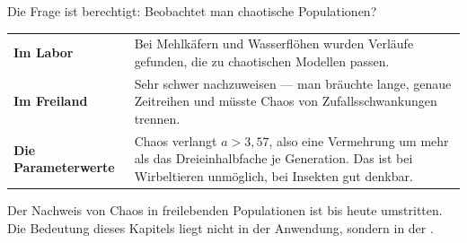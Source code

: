 \begin{warnung}
Die Frage ist berechtigt: Beobachtet man chaotische Populationen?

\begin{center}
{\small
\renewcommand{\arraystretch}{1.5}
\begin{tabular}{@{}P{2.6cm}P{6.0cm}@{}}
\toprule
\textbf{Im Labor} & Bei Mehlkäfern und Wasserflöhen wurden Verläufe gefunden, die zu chaotischen Modellen passen.\\
\textbf{Im Freiland} & Sehr schwer nachzuweisen --- man bräuchte lange, genaue Zeitreihen und müsste Chaos von Zufallsschwankungen trennen.\\
\textbf{Die Parameterwerte} & Chaos verlangt $a > 3{,}57$, also eine Vermehrung um mehr als das Dreieinhalbfache je Generation. Das ist bei Wirbeltieren unmöglich, bei Insekten gut denkbar.\\
\bottomrule
\end{tabular}}
\end{center}

\begin{center}
\begin{minipage}{0.9\textwidth}
Der Nachweis von Chaos in freilebenden Populationen ist bis heute umstritten. Die Bedeutung dieses Kapitels liegt nicht in der Anwendung, sondern in der .
\end{minipage}
\end{center}

\begin{center}
\begin{minipage}{0.88\textwidth}
\end{minipage}
\end{center}
\end{warnung}

